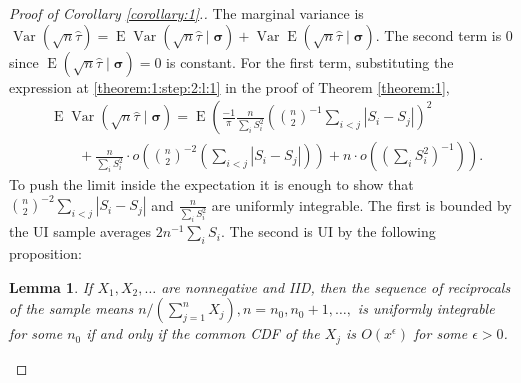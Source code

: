 \documentclass[12pt]{article}
\newtheorem{lemma}[theorem]{Lemma}
\newcommand{\s}{S}
\newcommand{\x}{X}
\DeclareMathOperator{\E}{E}
\DeclareMathOperator{\V}{Var}
\begin{document}
    \begin{proof}[Proof of Corollary \ref{corollary:1}.]
      The marginal variance is $\V(\sqrt{n}\hat\tau)=\E\V(\sqrt{n}\hat\tau\mid\pmb{\sigma}) + \V\E(\sqrt{n}\hat\tau\mid\pmb{\sigma}).$ The second term is $0$ since $\E(\sqrt{n}\hat\tau\mid\pmb{\sigma})=0$ is constant. For the first term, substituting the expression at \eqref{theorem:1:step:2:l:1} in the proof of Theorem \ref{theorem:1},
      \begin{align}
        &\E\V(\sqrt{n}\hat\tau\mid\pmb{\sigma})=\E\left(\frac{-1}{\pi}\frac{n}{\sum_i\s_i^2}
        \left(      {n\choose2}^{-1}\sum_{i<j}|\s_i-\s_j|\right)^2\right. \\
        &\qquad+ \left.\frac{n}{\sum_i\s_i^2}\cdot o\left({n\choose2}^{-2}\left(\sum_{i<j}|\s_i-\s_j|\right)\right)
        + n\cdot o\left(\left(\sum_i\s_i^2\right)^{-1}\right)\right).
      \end{align}
      To push the limit inside the expectation it is enough to show that ${n\choose2}^{-2}\sum_{i<j}|\s_i-\s_j|$ and $\frac{n}{\sum_i\s_i^2}$ are uniformly integrable.  The first is bounded by the UI sample averages $2n^{-1}\sum_i\s_i$. The second is UI by the following proposition:
  \begin{lemma}\label{lemma:1}
    If $\x_1,\x_2,\ldots$ are nonnegative and IID, then the sequence
    of reciprocals of the sample means
    $n/(\sum_{j=1}^n\x_j),n=n_0,n_0+1,\ldots,$ is uniformly integrable
    for some $n_0$ if and only if the common CDF of the $\x_j$ is
    $O(x^\epsilon)$ for some $\epsilon>0$.
  \end{lemma}


\end{proof}
\end{document}
